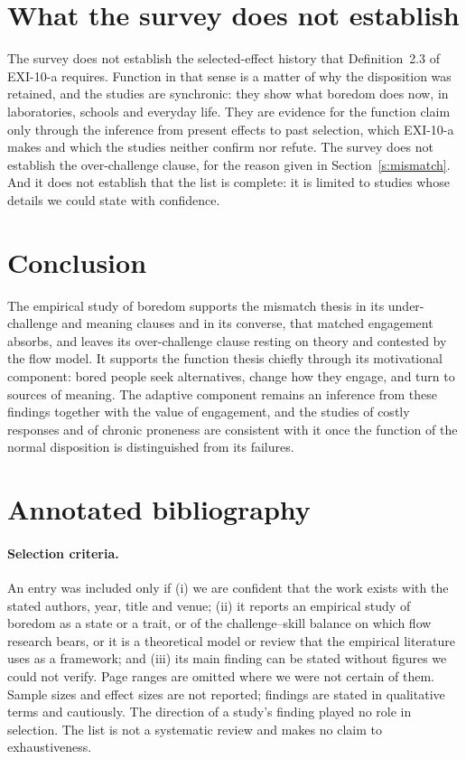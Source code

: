 \documentclass{situationist-preprint}
\begin{document}
\section{What the survey does not establish}\label{s:not}

The survey does not establish the selected-effect history that Definition~2.3 of EXI-10-a requires. Function in that sense is a matter of why the disposition was retained, and the studies are synchronic: they show what boredom does now, in laboratories, schools and everyday life. They are evidence for the function claim only through the inference from present effects to past selection, which EXI-10-a makes and which the studies neither confirm nor refute. The survey does not establish the over-challenge clause, for the reason given in Section~\ref{s:mismatch}. And it does not establish that the list is complete: it is limited to studies whose details we could state with confidence.

\section{Conclusion}

The empirical study of boredom supports the mismatch thesis in its under-challenge and meaning clauses and in its converse, that matched engagement absorbs, and leaves its over-challenge clause resting on theory and contested by the flow model. It supports the function thesis chiefly through its motivational component: bored people seek alternatives, change how they engage, and turn to sources of meaning. The adaptive component remains an inference from these findings together with the value of engagement, and the studies of costly responses and of chronic proneness are consistent with it once the function of the normal disposition is distinguished from its failures.

\appendix

\section{Annotated bibliography}\label{app:a}

\paragraph{Selection criteria.} An entry was included only if (i) we are confident that the work exists with the stated authors, year, title and venue; (ii) it reports an empirical study of boredom as a state or a trait, or of the challenge--skill balance on which flow research bears, or it is a theoretical model or review that the empirical literature uses as a framework; and (iii) its main finding can be stated without figures we could not verify. Page ranges are omitted where we were not certain of them. Sample sizes and effect sizes are not reported; findings are stated in qualitative terms and cautiously. The direction of a study's finding played no role in selection. The list is not a systematic review and makes no claim to exhaustiveness.
\end{document}

